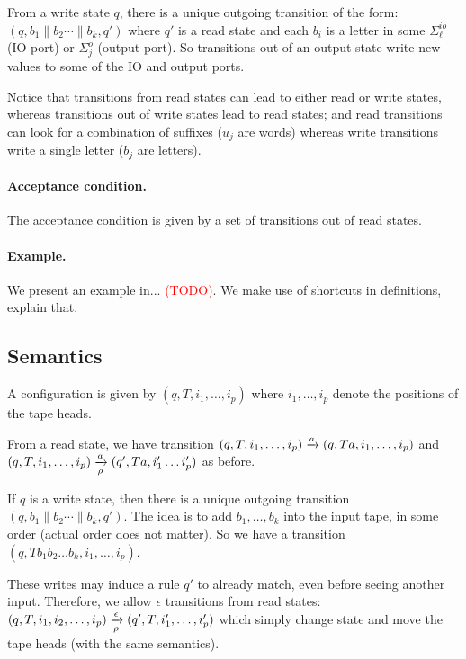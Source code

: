 From a write state $q$, there is a unique outgoing transition of the form: $(q, b_1 \parallel b_2 \cdots \parallel b_k, q')$ where $q'$ is a read state and each $b_i$ is a letter in some  $\Sigma^{io}_\ell$ (IO port) or $\Sigma^o_j$ (output port). So transitions out of an output state write new values to some of the IO and output ports.

Notice that transitions from read states can lead to either read or write states, whereas transitions out of write states lead to read states; and read transitions can look for a combination of suffixes ($u_j$ are words) whereas write transitions write a single letter ($b_j$ are letters).

\paragraph*{Acceptance condition.} The acceptance condition is given by a set of transitions out of read states.

\paragraph*{Example.} We present an example in... \textcolor{red}{(TODO)}. We make use of shortcuts in definitions, explain that.

\subsection{Semantics}

A configuration is given by $(q, T, i_1, \dots, i_p)$ where $i_1, \dots, i_p$ denote the positions of the tape heads. 

From a read state, we have transition $(q, T, i_1, \dots, i_p) \xrightarrow{a} (q, Ta, i_1, \dots, i_p)$ and $(q, T, i_1, \dots, i_p) \xrightarrow[\rho]{a} (q', Ta, i'_1 \dots i'_p)$ as before. 

If $q$ is a write state, then there is a unique outgoing transition $(q, b_1 \parallel b_2 \cdots \parallel b_k, q')$. The idea is to add $b_1, \dots, b_k$ into the input tape, in some order (actual order does not matter). So we have a transition $(q, Tb_1 b_2 \dots b_k, i_1, \dots, i_p)$.


These writes may induce a rule $q'$ to already match, even before seeing another input. Therefore, we allow $\epsilon$ transitions from read states: $(q, T, i_1, i_2, \dots, i_p) \xrightarrow[\rho]{\epsilon} (q', T, i'_1, \dots, i'_p)$ which simply change state and move the tape heads (with the same semantics). 
